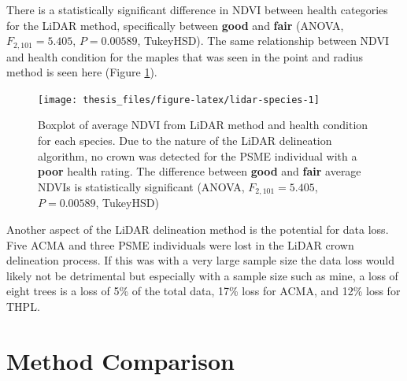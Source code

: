 \documentclass[12pt,twoside]{reedthesis}
\begin{document}
There is a statistically significant difference in NDVI between health categories for the LiDAR method, specifically between \textbf{good} and \textbf{fair} (ANOVA, \(F_{2,101} = 5.405\), \(P = 0.00589\), TukeyHSD). The same relationship between NDVI and health condition for the maples that was seen in the point and radius method is seen here (Figure \ref{fig:lidar-species}).


\begin{figure}

{\centering \texttt{[image: thesis\_files/figure-latex/lidar-species-1]} 

}

\caption[NDVI and health condition for LiDAR method]{Boxplot of average NDVI from LiDAR method and health condition for each species. Due to the nature of the LiDAR delineation algorithm, no crown was detected for the PSME individual with a \textbf{poor} health rating. The difference between \textbf{good} and \textbf{fair} average NDVIs is statistically significant (ANOVA, \(F_{2,101} = 5.405\), \(P = 0.00589\), TukeyHSD)}\label{fig:lidar-species}
\end{figure}
Another aspect of the LiDAR delineation method is the potential for data loss. Five ACMA and three PSME individuals were lost in the LiDAR crown delineation process. If this was with a very large sample size the data loss would likely not be detrimental but especially with a sample size such as mine, a loss of eight trees is a loss of 5\% of the total data, 17\% loss for ACMA, and 12\% loss for THPL.

\hypertarget{method-comparison}{%
\section{Method Comparison}\label{method-comparison}}
\end{document}

